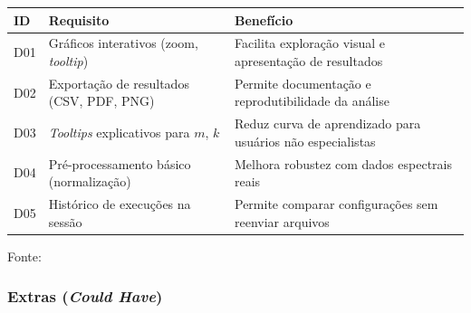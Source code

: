 \begin{quadro}[ht]
\begin{center}
\small
\captionsetup{justification=centering, labelsep=endash, width=0.75\linewidth}
\caption{Requisitos desejáveis do sistema}
\label{quadro:desejaveis}
\begin{threeparttable}
\begin{tabularx}{\textwidth}{|l|X|X|} \hline
\textbf{ID} & \textbf{Requisito} & \textbf{Benefício} \\ \hline
D01 & Gráficos interativos (zoom, \textit{tooltip}) & Facilita exploração visual e apresentação de resultados \\ \hline
D02 & Exportação de resultados (CSV, PDF, PNG) & Permite documentação e reprodutibilidade da análise \\ \hline
D03 & \textit{Tooltips} explicativos para $m$, $k$ & Reduz curva de aprendizado para usuários não especialistas \\ \hline
D04 & Pré-processamento básico (normalização) & Melhora robustez com dados espectrais reais \\ \hline
D05 & Histórico de execuções na sessão & Permite comparar configurações sem reenviar arquivos \\ \hline
\end{tabularx}
\begin{tablenotes}[flushleft]
\footnotesize
\item Fonte:~\oautor
\end{tablenotes}
\end{threeparttable}
\end{center}
\end{quadro}

\newpage

\subsubsection{Extras (\textit{Could Have})}
\label{ssubsec:extras}

